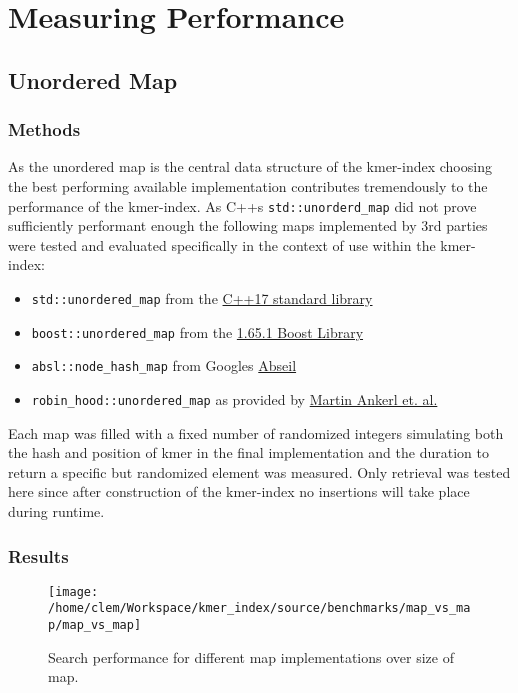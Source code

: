 \chapter{Measuring Performance}

\begin{minipage}{\linewidth}
\section{Unordered Map}
\subsection{Methods}
As the unordered map is the central data structure of the kmer-index choosing the best performing available
implementation contributes tremendously to the performance of the kmer-index. As C++s \lstinline{std::unorderd_map}
did not prove sufficiently performant enough the following maps implemented by 3rd parties were tested and evaluated
specifically in the context of use within the kmer-index:

\begin{itemize}
\item \lstinline{std::unordered_map} from the \href{https://en.cppreference.com/w/cpp/container/unordered_map}{C++17 standard library}
\item \lstinline{boost::unordered_map} from the \href{https://www.boost.org/doc/libs/1_65_0/doc/html/boost/unordered_map.html}{1.65.1 Boost Library}
\item \lstinline{absl::node_hash_map} from Googles \href{https://abseil.io/docs/cpp/guides/container\#abslnode_hash_map-and-abslnode_hash_set}{Abseil}
\item \lstinline{robin_hood::unordered_map} as provided by \href{https://github.com/martinus/robin-hood-hashing}{Martin Ankerl et. al.}
\end{itemize}

Each map was filled with a fixed number of randomized integers simulating both the hash and position of kmer in the
final implementation and the duration to return a specific but randomized element was measured. Only retrieval was tested
here since after construction of the kmer-index no insertions will take place during runtime.

\subsection{Results}
\begin{figure}[H] \label{}
\texttt{[image: /home/clem/Workspace/kmer\_index/source/benchmarks/map\_vs\_map/map\_vs\_map]}

\caption{Search performance for different map implementations over size of
map.}
\end{figure}
\end{minipage}

